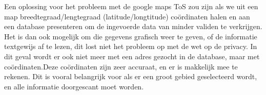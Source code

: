 Een oplossing voor het probleem met de google maps ToS zou zijn als we uit een map breedtegraad/lengtegraad (latitude/longtitude) co\"{o}rdinaten halen en aan een database presenteren om de ingevoerde data van minder validen te verkrijgen. Het is dan ook mogelijk om die gegevens grafisch weer te geven, of de informatie textgewijs af te lezen, dit lost niet het probleem op met de wet op de privacy. In dit geval wordt er ook niet meer met een adres gezocht in de database, maar met co\"{o}rdinaten.Deze co\"{o}rdinaten zijn zeer accuraat, en er is makkelijk mee te rekenen. Dit is vooral belangrijk voor als er een groot gebied geselecteerd wordt, en alle informatie doorgescant moet worden.




